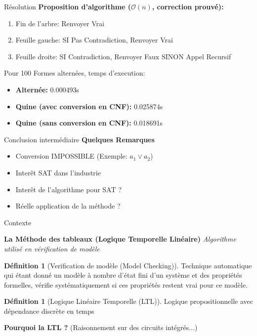 \documentclass{beamer}
\theoremstyle{definition}
\newtheorem{mydef}[theorem]{Définition}
\begin{document}
\begin{frame}[fragile]{Résolution}
    \textbf{Proposition d'algorithme ($\mathcal{O}(n)$, correction prouvé):}
    \begin{enumerate}
        \item Fin de l'arbre: Renvoyer Vrai
        \item Feuille gauche: SI Pas Contradiction, Renvoyer Vrai
        \item Feuille droite: SI Contradiction, Renvoyer Faux SINON Appel Recursif
    \end{enumerate}
    \pause

    \vspace{10px}
    Pour 100 Formes alternées, temps d'execution:
    \begin{itemize}
        \item \textbf{Alternée:} 0.000493s
        \item \textbf{Quine (avec conversion en CNF):} 0.025874s
        \item \textbf{Quine (sans conversion en CNF):} 0.018691s
    \end{itemize} 

\end{frame}
 
\begin{frame}{Conclusion intermédiaire}
    \textbf{Quelques Remarques}
    \begin{itemize}[<+->]
        \item Conversion IMPOSSIBLE (Exemple: $a_1\lor a_2$)
        \item Interêt SAT dans l'industrie
        \item Interêt de l'algorithme pour SAT ?
        \item Réelle application de la méthode ?
    \end{itemize}
\end{frame}

\begin{frame}{Contexte}
    \begin{center}
        \textbf{La Méthode des tableaux (Logique Temporelle Linéaire)}
        \textit{Algorithme utilisé en vérification de modèle}
    \end{center}
    \begin{mydef}[Verification de modèle (Model Checking)]
    Technique automatique qui étant donné un modèle à nombre d'état fini d'un système et des propriétés formelles,
    vérifie systématiquement si ces propriétés restent vrai pour ce modèle.
    \end{mydef}
    \begin{mydef}[Logique Linéaire Temporelle (LTL)]
    Logique propositionnelle avec dépendance discrète en temps
    \end{mydef}
    \pause
    \textbf{Pourquoi la LTL ?} (Raisonnement sur des circuits intégrés...)
\end{frame}
\end{document}
